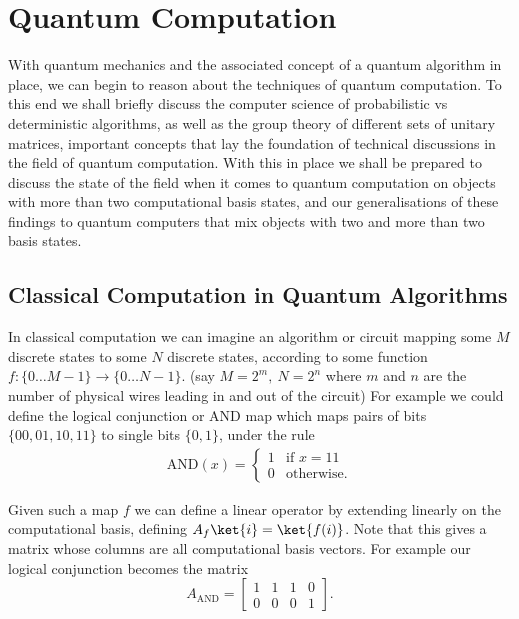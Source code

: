 \section{Quantum Computation}

With quantum mechanics and the associated concept of a quantum algorithm in place, we can begin to reason about the techniques of quantum computation. To this end we shall briefly discuss the computer science of probabilistic vs deterministic algorithms, as well as the group theory of different sets of unitary matrices, important concepts that lay the foundation of technical discussions in the field of quantum computation. With this in place we shall be prepared to discuss the state of the field when it comes to quantum computation on objects with more than two computational basis states, and our generalisations of these findings to quantum computers that mix objects with two and more than two basis states.

\subsection{Classical Computation in Quantum Algorithms}
In classical computation we can imagine an algorithm or circuit mapping some $M$ discrete states to some $N$ discrete states, according to some function $f: \{0\dots M-1\} \to \{0\dots N-1\}$. (say $M = 2^m,\ N = 2^n$ where $m$ and $n$ are the number of physical wires leading in and out of the circuit) For example we could define the logical conjunction or AND map which maps pairs of bits $\{00, 01, 10, 11\}$ to single bits $\{0, 1\}$, under the rule
\begin{align*}
	\text{AND}(x) = \begin{cases}
		1 & \text{if\ } x = 11\\
		0 & \text{otherwise.}
	\end{cases}
\end{align*}

Given such a map $f$ we can define a linear operator by extending linearly on the computational basis, defining $A_f\ket{i} = \ket{f(i)}$. Note that this gives a matrix whose columns are all computational basis vectors. For example our logical conjunction becomes the matrix
\[
A_\text{AND} = \left[\begin{matrix}
	1&1&1&0\\
	0&0&0&1
\end{matrix}\right].
\]

